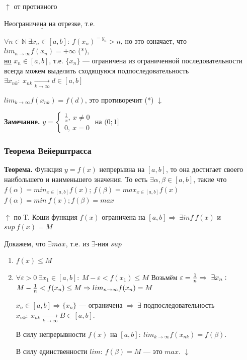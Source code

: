 \documentclass{article}
\begin{document}
    \(\uparrow\) от противного

    \(\underline{\textrm{Неограничена на отрезке}}\), т.е.

    \(\forall n \in \mathbb{N}\ \exists x_n \in [a,b]:\ f(x_n)^{=y_n} > n\), но это означает, что \(lim_{n \rightarrow \infty} f(x_n) = +\infty\) (*),\\
    \underline{\underline{но}} \(x_n \in [a,b]\), т.е. \(\{x_n\}\) --- ограничена из ограниченной последовательности всегда можем выделить сходящуюся подпоследовательность\\
    \(\exists x_{nk}:\ x_{nk} \xrightarrow[k \rightarrow \infty]{} d \in [a,b]\)

    \(lim_{k \rightarrow \infty} f(x_{nk}) = f(d)\), это противоречит (*) \(\downarrow\)

    \textbf{Замечание.}
    \( y = \begin{cases}
        \frac{1}{x},\ x \neq 0\\
        0,\ x = 0
    \end{cases} \) на \( (0; 1] \)
    

    \subsubsection{Теорема Вейерштрасса}
    \textbf{Теорема.} Функция \( y = f(x) \) непрерывна на \( [a, b] \), то она достигает своего наибольшего и наименьшего значения. То есть \( \exists \alpha, \beta \in [a, b] \), такие что \( f(\alpha) = min_{x \in [a, b]} f(x)\); \( f(\beta) = max_{x \in [a, b]} f(x)\)
    \( f(\alpha) = min\ f(x); f(\beta) = max \)

    \(\uparrow\) по Т. Коши функция \(f(x)\) ограничена на \([a,b] \Rightarrow\ \exists inf\ f(x)\) и \(sup\ f(x) = M\)
    
    Докажем, что \(\exists max\), т.е. из \(\exists\)-ния \(sup\) 

    \begin{enumerate}
        \item \(f(x) \leq M\)
        \item \(\forall \varepsilon > 0\ \exists x_1 \in [a,b]:\ M - \varepsilon < f(x_1) \leq M\)
        Возьмём \(\varepsilon = \frac{1}{n} \Rightarrow\ \exists x_n:\\\)
        \(M - \frac{1}{n} < f(x_n) \leq M\\ \Rightarrow lim_{n \rightarrow \infty} f(x_n) = M\)

        \(x_n \in [a,b] \Rightarrow \{x_n\}\) --- ограничена \(\Rightarrow\ \exists\) подпоследовательность \(x_{nk}:\ x_{nk} \xrightarrow[k \rightarrow \infty]{} B \in [a, b]\).

        В силу непрерывности \( f(x) \) на \( [a, b]:\ lim_{k \to \infty} f(x_{nk}) = f(\beta) \).

        В силу единственности \( lim:\ f(\beta) = M \) --- это \( max \). \( \downarrow \)
    \end{enumerate}
\end{document}
